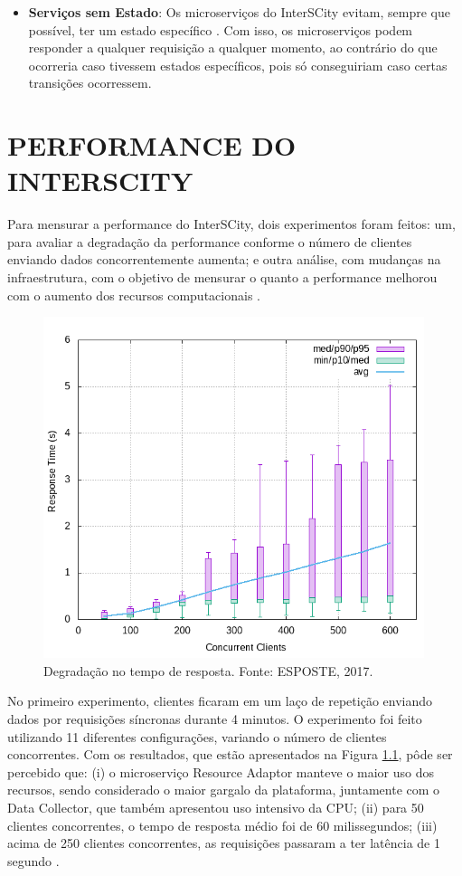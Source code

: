\begin{apendicesenv}
\begin{itemize}
    \item \textbf{Serviços sem Estado}: Os microserviços do InterSCity evitam,
sempre que possível, ter um estado específico \cite{delesposte2017}. Com isso,
os microserviços podem responder a qualquer requisição a qualquer momento, ao
contrário do que ocorreria caso tivessem estados específicos, pois só
conseguiriam caso certas transições ocorressem.
\end{itemize}

    \chapter{PERFORMANCE DO INTERSCITY}
    \label{appendix:performance}
Para mensurar a performance do InterSCity, dois experimentos foram feitos:
um, para avaliar a degradação da performance conforme o número de clientes
enviando dados concorrentemente aumenta; e outra análise, com mudanças na %
infraestrutura, com o objetivo de mensurar o quanto a performance melhorou
com o aumento dos recursos computacionais \cite{delesposte2017}.

\begin{figure}
  \centering
    \includegraphics[scale=0.7]{figuras/benchmark1.png}
    \caption{Degradação no tempo de resposta. Fonte: ESPOSTE, 2017.}
  \label{fig:benchmark1}
\end{figure}

No primeiro experimento, clientes ficaram em um laço de repetição enviando
dados por requisições síncronas durante 4 minutos. O experimento foi feito
utilizando 11 diferentes configurações, variando o número de clientes
concorrentes. Com os resultados, que estão apresentados na Figura
\ref{fig:benchmark1}, pôde ser percebido que: (i) o microserviço
Resource Adaptor manteve o maior uso dos recursos, sendo considerado o
maior gargalo da plataforma, juntamente com o Data Collector, que também
apresentou uso intensivo da CPU; (ii) para 50 clientes concorrentes, o
tempo de resposta médio foi de 60 milissegundos; (iii) acima de 250 clientes
concorrentes, as requisições passaram a ter latência de 1 segundo
\cite{delesposte2017}.


\end{apendicesenv}
